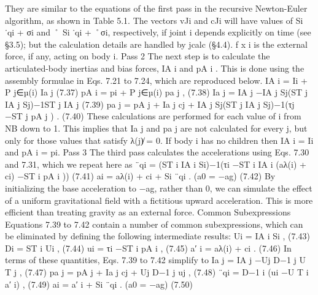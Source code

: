 They are similar to the equations of the first pass in the recursive Newton-Euler algorithm, as shown in Table 5.1. The vectors vJi and cJi will have values of Si ˙qi + σi and ˚ Si ˙qi + ˚σi, respectively, if joint i depends explicitly on time (see §3.5); but the calculation details are handled by jcalc (§4.4). f x i is the external force, if any, acting on body i. Pass 2 The next step is to calculate the articulated-body inertias and bias forces, IA i and pA i . This is done using the assembly formulae in Eqs. 7.21 to 7.24, which are reproduced below. IA i = Ii + P j∈µ(i) Ia j (7.37) pA i = pi + P j∈µ(i) pa j , (7.38) Ia j = IA j −IA j Sj(ST j IA j Sj)−1ST j IA j (7.39) pa j = pA j + Ia j cj + IA j Sj(ST j IA j Sj)−1(τj −ST j pA j ) . (7.40) These calculations are performed for each value of i from NB down to 1. This implies that Ia j and pa j are not calculated for every j, but only for those values that satisfy λ(j)̸ = 0. If body i has no children then IA i = Ii and pA i = pi. Pass 3 The third pass calculates the accelerations using Eqs. 7.30 and 7.31, which we repeat here as ¨qi = (ST i IA i Si)−1(τi −ST i IA i (aλ(i) + ci) −ST i pA i )) (7.41) ai = aλ(i) + ci + Si ¨qi . (a0 = −ag) (7.42) By initializing the base acceleration to −ag, rather than 0, we can simulate the effect of a uniform gravitational field with a fictitious upward acceleration. This is more efficient than treating gravity as an external force. Common Subexpressions Equations 7.39 to 7.42 contain a number of common subexpressions, which can be eliminated by defining the following intermediate results: Ui = IA i Si , (7.43) Di = ST i Ui , (7.44) ui = τi −ST i pA i , (7.45) a′ i = aλ(i) + ci . (7.46) In terms of these quantities, Eqs. 7.39 to 7.42 simplify to Ia j = IA j −Uj D−1 j U T j , (7.47) pa j = pA j + Ia j cj + Uj D−1 j uj , (7.48) ¨qi = D−1 i (ui −U T i a′ i) , (7.49) ai = a′ i + Si ¨qi . (a0 = −ag) (7.50)

